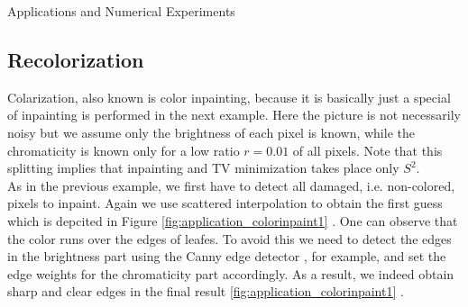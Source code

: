 \begin{chapter}{Applications and Numerical Experiments}


\FloatBarrier
\subsection{Recolorization} %
Colarization, also known is color inpainting, because it is basically just a special of inpainting is performed in the next example.
Here the picture is not necessarily noisy but we assume only the brightness of each pixel is known, while the chromaticity is known only for a low ratio $r=0.01$ of all pixels.
Note that this splitting implies that inpainting and TV minimization takes place only $S^2$.\\

As in the previous example, we first have to detect all damaged, i.e. non-colored, pixels to inpaint. Again we use scattered interpolation to obtain the first guess which is depcited
in Figure \ref{fig:application_colorinpaint1} . One can observe that the color runs over the edges of leafes. To avoid this we need to
detect the edges in the brightness part using the Canny edge detector \cite{Canny}, for example, and set the edge weights for the chromaticity part accordingly. As a result, we indeed
obtain sharp and clear edges in the final result \ref{fig:application_colorinpaint1} .


\end{chapter}
